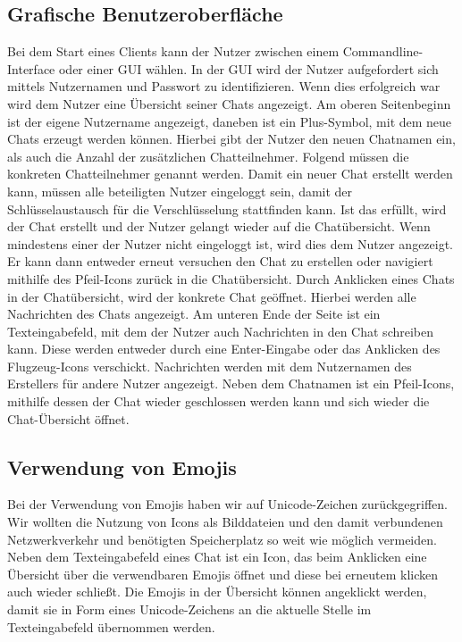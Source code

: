 
\author{Jan Grübener, Patrick Mischka}
\subsection{Grafische Benutzeroberfläche}

Bei dem Start eines Clients kann der Nutzer zwischen einem Commandline-Interface oder einer GUI wählen.
In der GUI wird der Nutzer aufgefordert sich mittels Nutzernamen und Passwort zu identifizieren. Wenn dies erfolgreich war wird dem Nutzer eine Übersicht seiner Chats angezeigt.
Am oberen Seitenbeginn ist der eigene Nutzername angezeigt, daneben ist ein Plus-Symbol, mit dem neue Chats erzeugt werden können. 
Hierbei gibt der Nutzer den neuen Chatnamen ein, als auch die Anzahl der zusätzlichen Chatteilnehmer. Folgend müssen die konkreten Chatteilnehmer genannt werden. 
Damit ein neuer Chat erstellt werden kann, müssen alle beteiligten Nutzer eingeloggt sein, damit der Schlüsselaustausch für die Verschlüsselung stattfinden kann.
Ist das erfüllt, wird der Chat erstellt und der Nutzer gelangt wieder auf die Chatübersicht. Wenn mindestens einer der Nutzer nicht eingeloggt ist, wird dies dem Nutzer angezeigt. Er kann dann entweder erneut versuchen den Chat zu erstellen oder navigiert mithilfe des Pfeil-Icons zurück in die Chatübersicht.
Durch Anklicken eines Chats in der Chatübersicht, wird der konkrete Chat geöffnet. Hierbei werden alle Nachrichten des Chats angezeigt. Am unteren Ende der Seite ist ein Texteingabefeld, mit dem der Nutzer auch Nachrichten in den Chat schreiben kann. Diese werden entweder durch eine Enter-Eingabe oder das Anklicken des Flugzeug-Icons verschickt. Nachrichten werden mit dem Nutzernamen des Erstellers für andere Nutzer angezeigt. 
Neben dem Chatnamen ist ein Pfeil-Icons, mithilfe dessen der Chat wieder geschlossen werden kann und sich wieder die Chat-Übersicht öffnet.

\author{Jan Grübener, Patrick Mischka}
\subsection{Verwendung von Emojis}

Bei der Verwendung von Emojis haben wir auf Unicode-Zeichen zurückgegriffen. 
Wir wollten die Nutzung von Icons als Bilddateien und den damit verbundenen Netzwerkverkehr und benötigten Speicherplatz so weit wie möglich vermeiden.
Neben dem Texteingabefeld eines Chat ist ein Icon, das beim Anklicken eine Übersicht über die verwendbaren Emojis öffnet und diese bei erneutem klicken auch wieder schließt. 
Die Emojis in der Übersicht können angeklickt werden, damit sie in Form eines Unicode-Zeichens an die aktuelle Stelle im Texteingabefeld übernommen werden.

